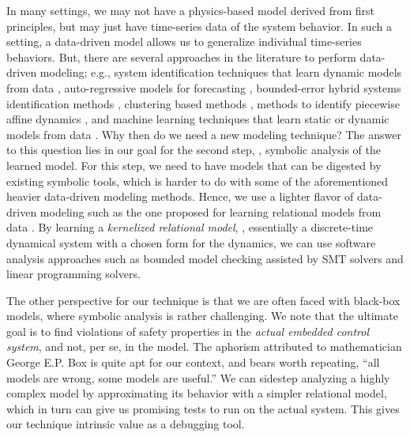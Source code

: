 In many settings, we may not have a physics-based model derived from
first principles, but may just have time-series data of the system
behavior. In such a setting, a data-driven model allows us to
generalize individual time-series behaviors. But, there are several
approaches in the literature to perform data-driven modeling; e.g.,
system identification techniques that learn dynamic models from data
\cite{ljung1999system}, auto-regressive models for forecasting
\cite{wei1994time}, bounded-error hybrid systems identification
methods \cite{bemporad2003greedy,bemporad2005bounded}, clustering
based methods \cite{ferrari2003clustering}, methods to identify
piecewise affine dynamics \cite{paoletti2007identification}, and
machine learning techniques that learn static or dynamic models from
data
\cite{narendra1990identification,lu2009linear,juloski2005bayesian}.
Why then do we need a new modeling technique? The answer to this
question lies in our goal for the second step, \ie, symbolic analysis
of the learned model. For this step, we need to have models that can
be digested by existing symbolic tools, which is harder to do with
some of the aforementioned heavier data-driven modeling methods.
Hence, we use a lighter flavor of data-driven modeling such as the one
proposed for learning relational models from data
\cite{zutshi2012timed,sankaranarayanan2011relational}. By learning a
{\em kernelized relational model}, \ie, essentially a discrete-time
dynamical system with a chosen form for the dynamics, we can use
software analysis approaches such as bounded model checking assisted
by SMT solvers and linear programming solvers.

The other perspective for our technique is that we are often faced
with black-box models, where symbolic analysis is rather challenging.
We note that the ultimate goal is to find violations of safety
properties in the {\em actual embedded control system}, and not, per
se, in the model. The aphorism attributed to mathematician George E.P.
Box is quite apt for our context, and bears worth repeating,  ``all
models are wrong, some models are useful.'' We can sidestep analyzing
a highly complex model by approximating its behavior with a simpler
relational model, which in turn can give us promising tests to run on
the actual system. This gives our technique intrinsic value as a
debugging tool.

